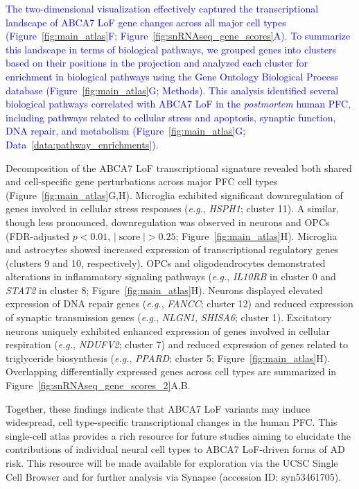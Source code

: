 \newcommand{\quoteG}{\textcolor{blue}{The two-dimensional visualization effectively captured the transcriptional landscape of ABCA7 LoF gene changes across all major cell types (Figure~\ref{fig:main_atlas}F; Figure~\ref{fig:snRNAseq_gene_scores}A). To summarize this landscape in terms of biological pathways, we grouped genes into clusters based on their positions in the projection and analyzed each cluster for enrichment in biological pathways using the Gene Ontology Biological Process database (Figure~\ref{fig:main_atlas}G; Methods). This analysis identified several biological pathways correlated with ABCA7 LoF in the \textit{postmortem} human PFC, including pathways related to cellular stress and apoptosis, synaptic function, DNA repair, and metabolism (Figure~\ref{fig:main_atlas}G; Data~\ref{data:pathway_enrichments}).\label{quoteG-label}}}\quoteG

Decomposition of the ABCA7 LoF transcriptional signature revealed both shared and cell-specific gene perturbations across major PFC cell types (Figure~\ref{fig:main_atlas}G,H). Microglia exhibited significant downregulation of genes involved in cellular stress responses (\textit{e.g.}, \textit{HSPH1}; cluster 11). A similar, though less pronounced, downregulation was observed in neurons and OPCs (FDR-adjusted $p<0.01$, $|\operatorname{score}|>0.25$; Figure~\ref{fig:main_atlas}H). Microglia and astrocytes showed increased expression of transcriptional regulatory genes (clusters 9 and 10, respectively). OPCs and oligodendrocytes demonstrated alterations in inflammatory signaling pathways (\textit{e.g.}, \textit{IL10RB} in cluster 0 and \textit{STAT2} in cluster 8; Figure~\ref{fig:main_atlas}H). Neurons displayed elevated expression of DNA repair genes (\textit{e.g.}, \textit{FANCC}; cluster 12) and reduced expression of synaptic transmission genes (\textit{e.g.}, \textit{NLGN1}, \textit{SHISA6}; cluster 1). Excitatory neurons uniquely exhibited enhanced expression of genes involved in cellular respiration (\textit{e.g.}, \textit{NDUFV2}; cluster 7) and reduced expression of genes related to triglyceride biosynthesis (\textit{e.g.}, \textit{PPARD}; cluster 5; Figure~\ref{fig:main_atlas}H). Overlapping differentially expressed genes across cell types are summarized in Figure~\ref{fig:snRNAseq_gene_scores_2}A,B.

Together, these findings indicate that ABCA7 LoF variants may induce widespread, cell type-specific transcriptional changes in the human PFC. This single-cell atlas provides a rich resource for future studies aiming to elucidate the contributions of individual neural cell types to ABCA7 LoF-driven forms of AD risk. This resource will be made available for exploration via the UCSC Single Cell Browser and for further analysis via Synapse (accession ID: syn53461705).

